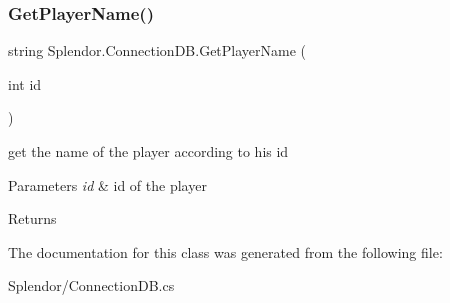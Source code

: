 \subsubsection{\texorpdfstring{Get\+Player\+Name()}{GetPlayerName()}}
{\footnotesize\ttfamily string Splendor.\+Connection\+D\+B.\+Get\+Player\+Name (\begin{DoxyParamCaption}\item[{int}]{id }\end{DoxyParamCaption})}



get the name of the player according to his id 


\begin{DoxyParams}{Parameters}
{\em id} & id of the player\\
\hline
\end{DoxyParams}
\begin{DoxyReturn}{Returns}

\end{DoxyReturn}


The documentation for this class was generated from the following file\+:\begin{DoxyCompactItemize}
\item 
Splendor/Connection\+D\+B.\+cs\end{DoxyCompactItemize}
